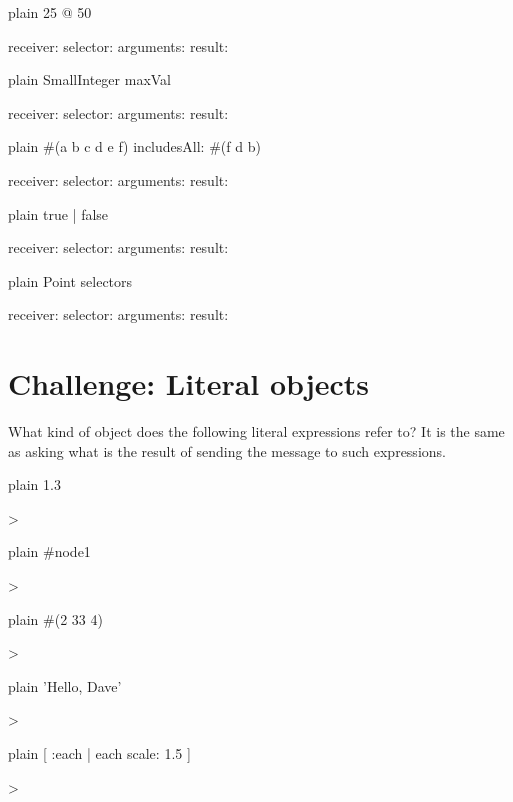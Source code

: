 \documentclass[10pt,twoside,english]{_support/latex/sbabook/sbabook}
\begin{document}
\begin{displaycode}{plain}
25 @ 50

	receiver: 
	selector:
	arguments:
	result:
\end{displaycode}

\begin{displaycode}{plain}
SmallInteger maxVal


	receiver: 
	selector:
	arguments:
	result:
\end{displaycode}

\begin{displaycode}{plain}
#(a b c d e f) includesAll: #(f d b)

	receiver: 
	selector:
	arguments:
	result:
\end{displaycode}

\begin{displaycode}{plain}
true | false

	receiver: 
	selector:
	arguments:
	result:
\end{displaycode}

\begin{displaycode}{plain}
Point selectors

	receiver: 
	selector:
	arguments:
	result:
\end{displaycode}
\section{Challenge: Literal objects}
What kind of object does the following literal expressions refer to? It is the same as asking what is the result of sending the  message to such expressions. 

\begin{displaycode}{plain}
1.3

>
\end{displaycode}

\begin{displaycode}{plain}
#node1

>
\end{displaycode}

\begin{displaycode}{plain}
#(2 33 4)

>
\end{displaycode}

\begin{displaycode}{plain}
'Hello, Dave'

>
\end{displaycode}

\begin{displaycode}{plain}
[ :each | each scale: 1.5 ]

>
\end{displaycode}
\end{document}

